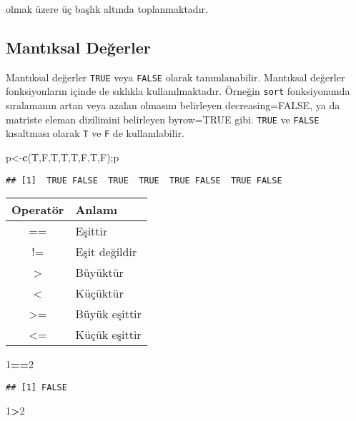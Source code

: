 \documentclass[
]{book}
\newenvironment{Shaded}{\begin{snugshade}}{\end{snugshade}}
\newcommand{\DecValTok}[1]{\textcolor[rgb]{0.00,0.00,0.81}{#1}}
\newcommand{\KeywordTok}[1]{\textcolor[rgb]{0.13,0.29,0.53}{\textbf{#1}}}
\newcommand{\NormalTok}[1]{#1}
\newcommand{\OperatorTok}[1]{\textcolor[rgb]{0.81,0.36,0.00}{\textbf{#1}}}
\begin{document}
olmak üzere üç başlık altında toplanmaktadır.

\hypertarget{mantux131ksal-deux11ferler}{%
\subsection{Mantıksal Değerler}\label{mantux131ksal-deux11ferler}}

Mantıksal değerler \texttt{TRUE} veya \texttt{FALSE} olarak tanımlanabilir. Mantıksal değerler fonksiyonların içinde de sıklıkla kullanılmaktadır. Örneğin \texttt{sort} fonksiyonunda sıralamanın artan veya azalan olmasını belirleyen decreasing=FALSE, ya da matriste eleman dizilimini belirleyen byrow=TRUE gibi. \texttt{TRUE} ve \texttt{FALSE} kısaltması olarak \texttt{T} ve \texttt{F} de kullanılabilir.

\begin{Shaded}
\begin{Highlighting}[]
\NormalTok{p<-}\KeywordTok{c}\NormalTok{(T,F,T,T,T,F,T,F);p}
\end{Highlighting}
\end{Shaded}

\begin{verbatim}
## [1]  TRUE FALSE  TRUE  TRUE  TRUE FALSE  TRUE FALSE
\end{verbatim}

\begin{longtable}[]{@{}cl@{}}
\toprule
Operatör & Anlamı\tabularnewline
\midrule
\endhead
== & Eşittir\tabularnewline
!= & Eşit değildir\tabularnewline
\textgreater{} & Büyüktür\tabularnewline
\textless{} & Küçüktür\tabularnewline
\textgreater= & Büyük eşittir\tabularnewline
\textless= & Küçük eşittir\tabularnewline
\bottomrule
\end{longtable}

\begin{Shaded}
\begin{Highlighting}[]
\DecValTok{1}\OperatorTok{==}\DecValTok{2}
\end{Highlighting}
\end{Shaded}

\begin{verbatim}
## [1] FALSE
\end{verbatim}

\begin{Shaded}
\begin{Highlighting}[]
\DecValTok{1}\OperatorTok{>}\DecValTok{2}
\end{Highlighting}
\end{Shaded}
\end{document}

